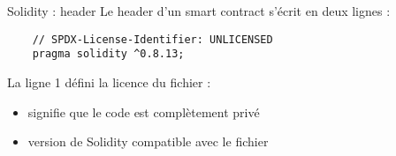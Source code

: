 \begin{frame}[fragile]{Solidity : header}
  Le header d'un smart contract s'écrit en deux lignes :

  \begin{verbatim}
    // SPDX-License-Identifier: UNLICENSED
    pragma solidity ^0.8.13;
  \end{verbatim}

  La ligne 1 défini la licence du fichier :

  \begin{itemize}
    \item {} signifie que le code est complètement privé
    \item {} version de Solidity compatible avec le fichier
  \end{itemize}
\end{frame}

